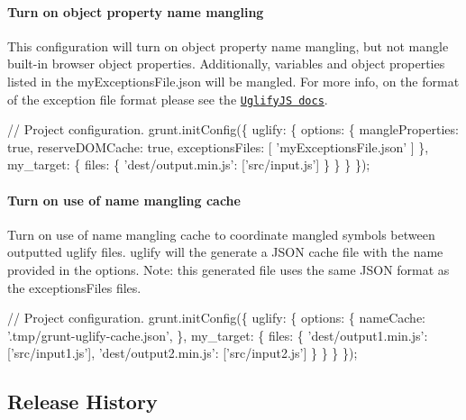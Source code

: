 \paragraph*{Turn on object property name mangling}

This configuration will turn on object property name mangling, but not mangle built-\/in browser object properties. Additionally, variables and object properties listed in the {\ttfamily my\+Exceptions\+File.\+json} will be mangled. For more info, on the format of the exception file format please see the \href{https://www.npmjs.com/package/uglify-js}{\tt Uglify\+JS docs}.


\begin{DoxyCode}
// Project configuration.
grunt.initConfig(\{
  uglify: \{
    options: \{
      mangleProperties: true,
      reserveDOMCache: true,
      exceptionsFiles: [ 'myExceptionsFile.json' ]
    \},
    my\_target: \{
      files: \{
        'dest/output.min.js': ['src/input.js']
      \}
    \}
  \}
\});
\end{DoxyCode}


\paragraph*{Turn on use of name mangling cache}

Turn on use of name mangling cache to coordinate mangled symbols between outputted uglify files. uglify will the generate a J\+S\+ON cache file with the name provided in the options. Note\+: this generated file uses the same J\+S\+ON format as the {\ttfamily exceptions\+Files} files.


\begin{DoxyCode}
// Project configuration.
grunt.initConfig(\{
  uglify: \{
    options: \{
      nameCache: '.tmp/grunt-uglify-cache.json',
    \},
    my\_target: \{
      files: \{
        'dest/output1.min.js': ['src/input1.js'],
        'dest/output2.min.js': ['src/input2.js']
      \}
    \}
  \}
\});
\end{DoxyCode}


\subsection*{Release History}



